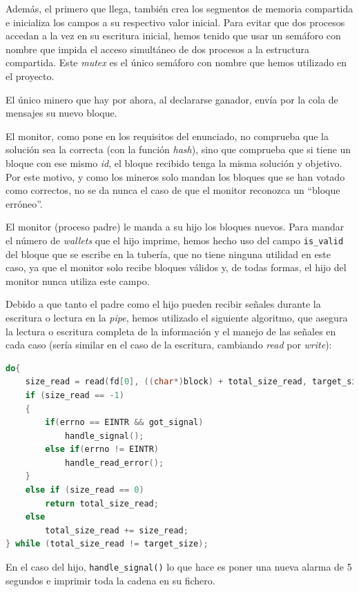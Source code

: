 \documentclass{article}
\begin{document}
    Además, el primero que llega, también crea los segmentos de memoria compartida e inicializa los campos a su respectivo valor inicial. Para evitar que dos procesos accedan a la vez en su escritura inicial, hemos tenido que usar un semáforo con nombre que impida el acceso simultáneo de dos procesos a la estructura compartida.
    Este \textit{mutex} es el único semáforo con nombre que hemos utilizado en el proyecto.

    El único minero que hay por ahora, al declararse ganador, envía por la cola de mensajes su nuevo bloque.

    El monitor, como pone en los requisitos del enunciado, no comprueba que la solución sea la correcta (con la función \emph{hash}), sino que comprueba que si tiene un bloque con ese mismo \emph{id}, el bloque recibido tenga la misma solución y objetivo. Por este motivo, y como los mineros solo mandan los bloques que se han votado como correctos, no se da nunca el caso de que el monitor reconozca un ``bloque erróneo''.

    El monitor (proceso padre) le manda a su hijo los bloques nuevos. Para mandar el número de \emph{wallets} que el hijo imprime, hemos hecho uso del campo \texttt{is\_valid} del bloque que se escribe en la tubería, que no tiene ninguna utilidad en este caso, ya que el monitor solo recibe bloques válidos y, de todas formas, el hijo del monitor nunca utiliza este campo.
    
    Debido a que tanto el padre como el hijo pueden recibir señales durante la escritura o lectura en la \textit{pipe}, hemos utilizado el siguiente algoritmo, que asegura la lectura o escritura completa de la información y el manejo de las señales en cada caso (sería similar en el caso de la escritura, cambiando \emph{read} por \emph{write}):

    \begin{lstlisting}[language=C]
do{
    size_read = read(fd[0], ((char*)block) + total_size_read, target_size - total_size_read);
    if (size_read == -1)
    {
        if(errno == EINTR && got_signal)
            handle_signal();
        else if(errno != EINTR)
            handle_read_error();
    }
    else if (size_read == 0)
        return total_size_read;
    else
        total_size_read += size_read;
} while (total_size_read != target_size);\end{lstlisting}

    En el caso del hijo, \texttt{handle\_signal()} lo que hace es poner una nueva alarma de 5 segundos e imprimir toda la cadena en su fichero.
\end{document}
